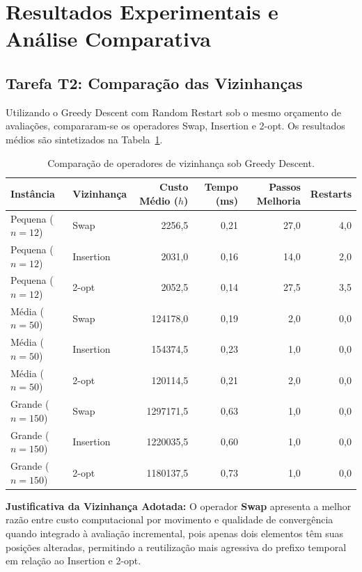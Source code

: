 \documentclass[11pt,a4paper]{article}
\begin{document}
\section{Resultados Experimentais e Análise Comparativa}

\subsection{Tarefa T2: Comparação das Vizinhanças}
Utilizando o Greedy Descent com Random Restart sob o mesmo orçamento de avaliações, compararam-se os operadores Swap, Insertion e 2-opt. Os resultados médios são sintetizados na Tabela~\ref{tab:t2_vizinhancas}.

\begin{table}[H]
\centering
\caption{Comparação de operadores de vizinhança sob Greedy Descent.}
\label{tab:t2_vizinhancas}
\small
\begin{tabular}{llrrrr}
\toprule
\textbf{Instância} & \textbf{Vizinhança} & \textbf{Custo Médio ($h$)} & \textbf{Tempo (ms)} & \textbf{Passos Melhoria} & \textbf{Restarts} \\
\midrule
Pequena ($n=12$) & Swap      & 2256{,}5 & 0{,}21 & 27{,}0 & 4{,}0 \\
Pequena ($n=12$) & Insertion & 2031{,}0 & 0{,}16 & 14{,}0 & 2{,}0 \\
Pequena ($n=12$) & 2-opt     & 2052{,}5 & 0{,}14 & 27{,}5 & 3{,}5 \\
\midrule
Média ($n=50$)   & Swap      & 124178{,}0 & 0{,}19 & 2{,}0 & 0{,}0 \\
Média ($n=50$)   & Insertion & 154374{,}5 & 0{,}23 & 1{,}0 & 0{,}0 \\
Média ($n=50$)   & 2-opt     & 120114{,}5 & 0{,}21 & 2{,}0 & 0{,}0 \\
\midrule
Grande ($n=150$) & Swap      & 1297171{,}5 & 0{,}63 & 1{,}0 & 0{,}0 \\
Grande ($n=150$) & Insertion & 1220035{,}5 & 0{,}60 & 1{,}0 & 0{,}0 \\
Grande ($n=150$) & 2-opt     & 1180137{,}5 & 0{,}73 & 1{,}0 & 0{,}0 \\
\bottomrule
\end{tabular}
\end{table}

\textbf{Justificativa da Vizinhança Adotada:} O operador \textbf{Swap} apresenta a melhor razão entre custo computacional por movimento e qualidade de convergência quando integrado à avaliação incremental, pois apenas dois elementos têm suas posições alteradas, permitindo a reutilização mais agressiva do prefixo temporal em relação ao Insertion e 2-opt.
\end{document}
